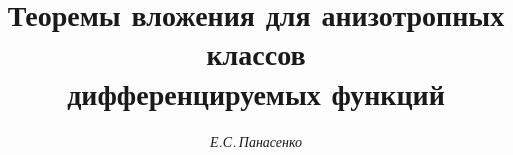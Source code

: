 

 




 


\newcommand{\mes}{\operatorname{mes}} 


\newcommand{\tts}[1]{} 


 




  


\setcounter{page}{80} 












\author{\it Е.С.\,Панасенко} 




\title{Теоремы вложения для анизотропных классов\\ 


дифференцируемых функций} 


 


\date{} 




 


\pagestyle{plain} %


 


 




 


\maketitle 


